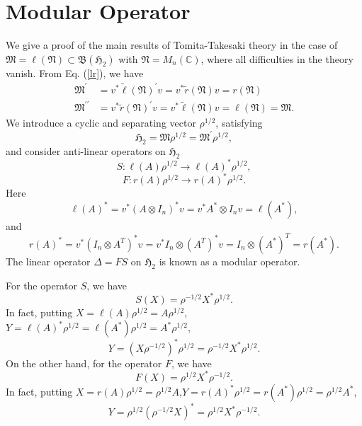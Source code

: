 \section{Modular Operator}
We give a proof  of the main results of Tomita-Takesaki theory in the case of 
$\mathfrak{M}=\ell(\mathfrak{N}) \subset \mathfrak{B}(\mathfrak{H}_2)$ with $\mathfrak{N}=M_n(\mathbb{C})$,
where all difficulties in the theory vanish.
From Eq. (\ref{lr}),
we have
\begin{equation}
\begin{split}
\mathfrak{M}^\prime&=v^\ast \tilde{\ell}(\mathfrak{N})^\prime v= v^\ast \tilde{r}(\mathfrak{N})v=r(\mathfrak{N}) \\
\mathfrak{M}^{\prime\prime}&=v^\ast \tilde{r}(\mathfrak{N})^\prime v= v^\ast \tilde{\ell}(\mathfrak{N})v=\ell(\mathfrak{N})=\mathfrak{M}.
\end{split}
\end{equation}
We introduce  a cyclic and separating vector $\rho^{1/2}$, satisfying 
$$
\mathfrak{H}_2=\mathfrak{M}\rho^{1/2}=\mathfrak{M}^\prime \rho^{1/2},
$$
and consider  anti-linear operators on $\mathfrak{H}_2$ 
\begin{equation}\label{OprS}
		 S:\ell(A) \rho^{1/2} \to \ell(A)^\ast\rho^{1/2},
\end{equation}
\begin{equation}\label{OprF}
		 F:r(A) \rho^{1/2} \to r(A)^\ast\rho^{1/2}.
\end{equation}
Here 
	$$
	\ell(A)^\ast=v^\ast(A\otimes I_n)^\ast v=v^\ast A^\ast \otimes I_n v=\ell(A^\ast),
	$$
	and
	$$
  r(A)^\ast=v^\ast (I_n\otimes A^T)^\ast v=v^\ast I_n\otimes (A^T)^\ast v=I_n\otimes (A^\ast)^T=r(A^\ast).
	$$
	The linear operator $\Delta=FS$ on $\mathfrak{H}_2$ is known as a modular operator.

For the operator $S$, we have 
	$$
    S(X)=\rho^{-1/2}X^*\rho^{1/2}.
 	$$
	In fact, putting $X=\ell(A)\rho^{1/2}=A\rho^{1/2}$,$Y=\ell(A)^\ast\rho^{1/2}=\ell(A^\ast)\rho^{1/2}=A^\ast \rho^{1/2}$,
	$$
    Y=(X\rho^{-1/2})^\ast \rho^{1/2}=\rho^{-1/2}X^\ast\rho^{1/2}.
  $$
On the other hand, for the operator $F$, we have
$$
F(X)=\rho^{1/2}X^\ast \rho^{-1/2}.
$$
In fact, putting $X=r(A)\rho^{1/2}=\rho^{1/2}A$,$Y=r(A)^\ast\rho^{1/2}=r(A^\ast)\rho^{1/2}= \rho^{1/2}A^\ast$,
	$$
    Y= \rho^{1/2}(\rho^{-1/2}X)^\ast=\rho^{1/2}X^\ast\rho^{-1/2}.
  $$